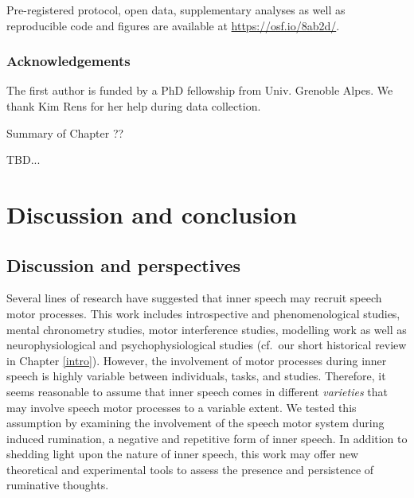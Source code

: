 \documentclass[a4paper,12pt,twoside,openright,oldfontcommands,final]{memoir}
\newcommand{\initial}[1]{
	\lettrine[lines=3,lhang=0.33,nindent=0em]{
		\color{gray}
     		{\textsc{#1}}}{}}
\newcommand\getcurrentref[1]{
 \ifnumequal{\value{#1}}{0}
  {??}
  {\the\value{#1}}
}
\begin{document}
Pre-registered protocol, open data, supplementary analyses as well as reproducible code and figures are available at \url{https://osf.io/8ab2d/}.

\hypertarget{acknowledgements-4}{%
\section{Acknowledgements}\label{acknowledgements-4}}

The first author is funded by a PhD fellowship from Univ. Grenoble Alpes. We thank Kim Rens for her help during data collection.

\newpage

\begin{vplace}[1]

\begin{summary}{Summary of Chapter\getcurrentref{chapter}}

TBD...

\end{summary}

\end{vplace}

\hypertarget{part-discussion-and-conclusion}{%
\part{Discussion and conclusion}\label{part-discussion-and-conclusion}}

\hypertarget{chap8}{%
\chapter{Discussion and perspectives}\label{chap8}}

\initial{S}everal lines of research have suggested that inner speech may recruit speech motor processes. This work includes introspective and phenomenological studies, mental chronometry studies, motor interference studies, modelling work as well as neurophysiological and psychophysiological studies (cf.~our short historical review in Chapter \ref{intro}). However, the involvement of motor processes during inner speech is highly variable between individuals, tasks, and studies. Therefore, it seems reasonable to assume that inner speech comes in different \emph{varieties} that may involve speech motor processes to a variable extent. We tested this assumption by examining the involvement of the speech motor system during induced rumination, a negative and repetitive form of inner speech. In addition to shedding light upon the nature of inner speech, this work may offer new theoretical and experimental tools to assess the presence and persistence of ruminative thoughts.
\end{document}
